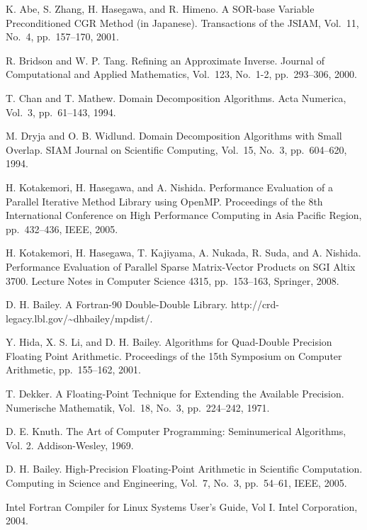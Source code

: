 \documentclass[a4paper]{article}
\begin{document}
\begin{thebibliography}{10}
K. Abe, S. Zhang, H. Hasegawa, and R. Himeno.
\newblock A SOR-base Variable Preconditioned CGR Method (in Japanese).
\newblock Transactions of the JSIAM,  Vol.~11, No.~4, pp.\ 157--170, 2001.

R. Bridson and W. P. Tang.
\newblock Refining an Approximate Inverse.
\newblock Journal of Computational and Applied Mathematics, Vol.~123, No.~1-2, pp.\ 293--306, 2000. 

T. Chan and T. Mathew.
\newblock Domain Decomposition Algorithms.
\newblock Acta Numerica, Vol.~3, pp.\ 61--143, 1994. 

M. Dryja and O. B. Widlund.
\newblock Domain Decomposition Algorithms with Small Overlap.
\newblock SIAM Journal on Scientific Computing, Vol.~15, No.~3, pp.\ 604--620, 1994.

H. Kotakemori, H. Hasegawa, and A. Nishida.
\newblock Performance Evaluation of a Parallel Iterative Method Library using OpenMP.
\newblock Proceedings of the 8th International Conference on High
	Performance Computing in Asia Pacific Region, pp.\ 432--436, IEEE, 2005.

H. Kotakemori, H. Hasegawa, T. Kajiyama, A. Nukada, R. Suda, and A. Nishida.
\newblock Performance Evaluation of Parallel Sparse Matrix-Vector Products on SGI Altix 3700.
\newblock Lecture Notes in Computer Science 4315, pp.\ 153--163, Springer, 2008.

D. H. Bailey.
\newblock A Fortran-90 Double-Double Library.
\newblock http://crd-legacy.lbl.gov/\textasciitilde dhbailey/mpdist/.

Y. Hida, X. S. Li, and D. H. Bailey.
\newblock Algorithms for Quad-Double Precision Floating Point Arithmetic.
\newblock Proceedings of the 15th Symposium on Computer Arithmetic, pp.\ 155--162, 2001.

T. Dekker.
\newblock A Floating-Point Technique for Extending the Available Precision.
\newblock Numerische Mathematik, Vol.~18, No.~3, pp.\ 224--242, 1971.

D. E. Knuth.
The Art of Computer Programming: Seminumerical Algorithms, Vol. 2.
Addison-Wesley, 1969.

D. H. Bailey.
\newblock High-Precision Floating-Point Arithmetic in Scientific
	Computation.
\newblock Computing in Science and Engineering, Vol.~7, No.~3, pp.\ 54--61, IEEE, 2005.

\newblock Intel Fortran Compiler for Linux Systems User's Guide, Vol I.
\newblock Intel Corporation, 2004.


\end{thebibliography}
\end{document}
